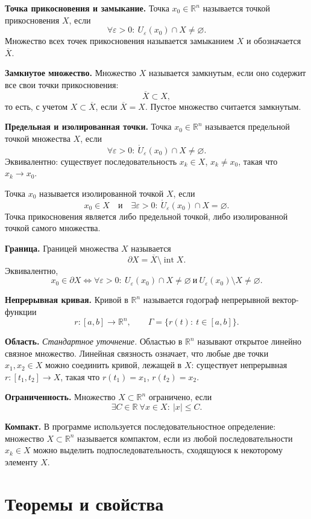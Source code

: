 \documentclass[12pt,a4paper]{article}
\newcommand{\R}{\mathbb{R}}
\newcommand{\eps}{\varepsilon}
\newcommand{\Ball}[2]{U_{#1}(#2)}
\newcommand{\PBall}[2]{\mathring U_{#1}(#2)}
\begin{document}
\textbf{Точка прикосновения и замыкание.}
Точка \(x_0\in\R^n\) называется точкой прикосновения \(X\), если
\[
  \forall \eps>0:\ \Ball{\eps}{x_0}\cap X\ne\varnothing.
\]
Множество всех точек прикосновения называется замыканием \(X\) и обозначается
\(\overline X\).

\textbf{Замкнутое множество.}
Множество \(X\) называется замкнутым, если оно содержит все свои точки
прикосновения:
\[
  \overline X\subset X,
\]
то есть, с учетом \(X\subset\overline X\), если \(\overline X=X\). Пустое
множество считается замкнутым.

\textbf{Предельная и изолированная точки.}
Точка \(x_0\in\R^n\) называется предельной точкой множества \(X\), если
\[
  \forall \eps>0:\ \PBall{\eps}{x_0}\cap X\ne\varnothing.
\]
Эквивалентно: существует последовательность \(x_k\in X\), \(x_k\ne x_0\),
такая что \(x_k\to x_0\).

Точка \(x_0\) называется изолированной точкой \(X\), если
\[
  x_0\in X
  \quad\text{и}\quad
  \exists \eps>0:\ \PBall{\eps}{x_0}\cap X=\varnothing.
\]
Точка прикосновения является либо предельной точкой, либо изолированной
точкой самого множества.

\textbf{Граница.}
Границей множества \(X\) называется
\[
  \partial X=\overline X\setminus \operatorname{int}X.
\]
Эквивалентно,
\[
  x_0\in\partial X
  \Longleftrightarrow
  \forall \eps>0:\ \Ball{\eps}{x_0}\cap X\ne\varnothing
  \ \text{и}\ 
  \Ball{\eps}{x_0}\setminus X\ne\varnothing.
\]

\textbf{Непрерывная кривая.}
Кривой в \(\R^n\) называется годограф непрерывной вектор-функции
\[
  r:[a,b]\to\R^n,\qquad
  \Gamma=\{r(t):\ t\in[a,b]\}.
\]

\textbf{Область.}
\emph{Стандартное уточнение.} Областью в \(\R^n\) называют открытое линейно
связное множество. Линейная связность означает, что любые две точки
\(x_1,x_2\in X\) можно соединить кривой, лежащей в \(X\): существует
непрерывная \(r:[t_1,t_2]\to X\), такая что \(r(t_1)=x_1\), \(r(t_2)=x_2\).

\textbf{Ограниченность.}
Множество \(X\subset\R^n\) ограничено, если
\[
  \exists C\in\R\ \forall x\in X:\ |x|\le C.
\]

\textbf{Компакт.}
В программе используется последовательностное определение: множество
\(X\subset\R^n\) называется компактом, если из любой последовательности
\(x_k\in X\) можно выделить подпоследовательность, сходящуюся к некоторому
элементу \(X\).

\section*{Теоремы и свойства}
\end{document}

